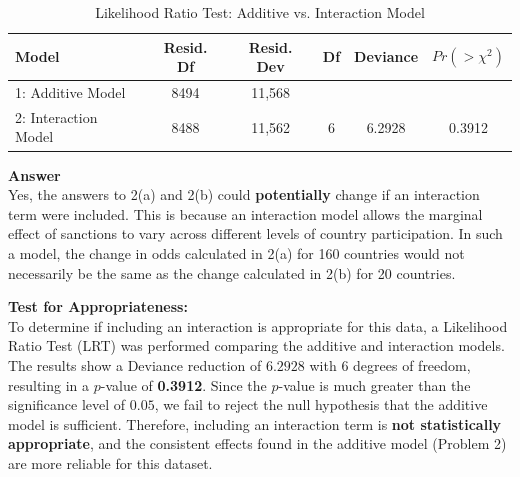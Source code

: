 \documentclass[12pt,letterpaper]{article}
\begin{document}
\begin{enumerate}
		
		
		\begin{table}[ht]
			\centering
			\caption{Likelihood Ratio Test: Additive vs. Interaction Model}
			\label{tab:lrt_interaction}
			\begin{tabular}{l c c c c c}
				\hline \hline
				Model & Resid. Df & Resid. Dev & Df & Deviance & $Pr(>\chi^{2})$ \\ 
				\hline
				1: Additive Model & 8494 & 11,568 & & & \\
				2: Interaction Model & 8488 & 11,562 & 6 & 6.2928 & 0.3912 \\
				\hline \hline
			\end{tabular}
		\end{table}
		
		\noindent \textbf{Answer} \\
		Yes, the answers to 2(a) and 2(b) could \textbf{potentially} change if an interaction term were included. This is because an interaction model allows the marginal effect of sanctions to vary across different levels of country participation. In such a model, the change in odds calculated in 2(a) for 160 countries would not necessarily be the same as the change calculated in 2(b) for 20 countries.
		
		\vspace{0.3cm}
		
		\noindent \textbf{Test for Appropriateness:} \\
		To determine if including an interaction is appropriate for this data, a Likelihood Ratio Test (LRT) was performed comparing the additive and interaction models. The results show a Deviance reduction of $6.2928$ with $6$ degrees of freedom, resulting in a $p$-value of \textbf{0.3912}. Since the $p$-value is much greater than the significance level of $0.05$, we fail to reject the null hypothesis that the additive model is sufficient. Therefore, including an interaction term is \textbf{not statistically appropriate}, and the consistent effects found in the additive model (Problem 2) are more reliable for this dataset.
		
	\end{enumerate}
	
	
\end{document}
